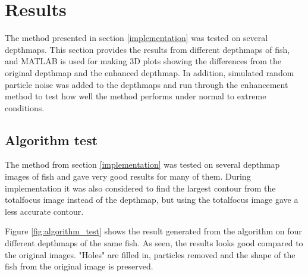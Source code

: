 \section{Results}\label{results}

The method presented in section \ref{implementation} was tested on several depthmaps. This section provides the results from different depthmaps of fish, and MATLAB is used for making 3D plots showing the differences from the original depthmap and the enhanced depthmap. 
In addition, simulated random particle noise was added to the depthmaps and run through the enhancement method to test how well the method performs under normal to extreme conditions.


\subsection{Algorithm test}

The method from section \ref{implementation} was tested on several depthmap images of fish and gave very good results for many of them. During implementation it was also considered to find the largest contour from the totalfocus image instead of the depthmap, but using the totalfocus image gave a less accurate contour. 

Figure \ref{fig:algorithm_test} shows the result generated from the algorithm on four different depthmaps of the same fish.
As seen, the results looks good compared to the original images. "Holes" are filled in, particles removed and the shape of the fish from the original image is preserved. 



